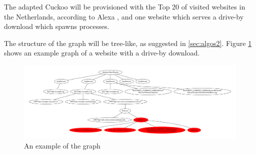 The adapted Cuckoo will be provisioned with the Top 20 of visited websites in the Netherlands, according to Alexa \cite{http://www.alexa.com/topsites/countries/NL}, and one website which serves a drive-by download which spawns processes.

The structure of the graph will be tree-like, as suggested in \ref{sec:algos2}. Figure \ref{fig:alg_tree} shows an example graph of a website with a drive-by download.

\begin{figure}[h]
    \centering
    \centerline{\includegraphics[width=19cm]{Images/alg_tree}}
    \caption{An example of the graph}
    \label{fig:alg_tree}
\end{figure}

